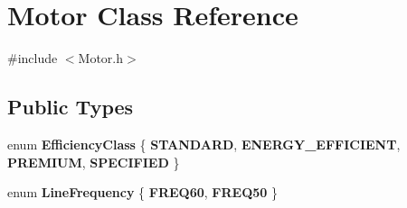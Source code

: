 \hypertarget{class_motor}{}\section{Motor Class Reference}
\label{class_motor}


{\ttfamily \#include $<$Motor.\+h$>$}

\subsection*{Public Types}
\begin{DoxyCompactItemize}
\item 
\mbox{\label{class_motor_afa022971ae062406a9f588c601673d4e}} 
enum {\bfseries Efficiency\+Class} \{ {\bfseries S\+T\+A\+N\+D\+A\+RD}, 
{\bfseries E\+N\+E\+R\+G\+Y\+\_\+\+E\+F\+F\+I\+C\+I\+E\+NT}, 
{\bfseries P\+R\+E\+M\+I\+UM}, 
{\bfseries S\+P\+E\+C\+I\+F\+I\+ED}
 \}
\item 
\mbox{\label{class_motor_acee1bdf1b684ad36cb80dc2829d9fcee}} 
enum {\bfseries Line\+Frequency} \{ {\bfseries F\+R\+E\+Q60}, 
{\bfseries F\+R\+E\+Q50}
 \}
\end{DoxyCompactItemize}
